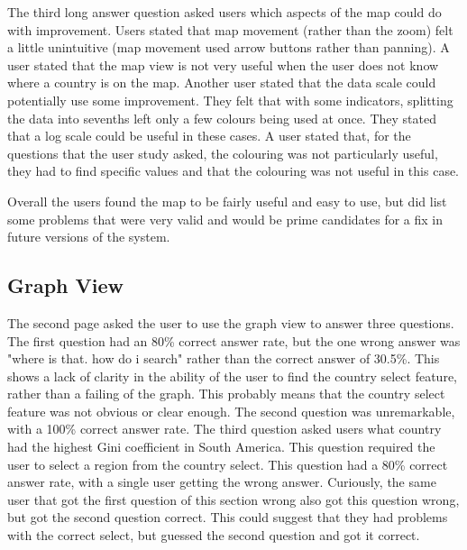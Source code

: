 \documentclass[10pt, journal]{IEEEtran}
\begin{document}
The third long answer question asked users which aspects of the map could do with improvement. Users stated that map movement (rather than the zoom) felt a little unintuitive (map movement used arrow buttons rather than panning). A user stated that the map view is not very useful when the user does not know where a country is on the map. Another user stated that the data scale could potentially use some improvement. They felt that with some indicators, splitting the data into sevenths left only a few colours being used at once. They stated that a log scale could be useful in these cases. A user stated that, for the questions that the user study asked, the colouring was not particularly useful, they had to find specific values and that the colouring was not useful in this case.

Overall the users found the map to be fairly useful and easy to use, but did list some problems that were very valid and would be prime candidates for a fix in future versions of the system.

\subsection{Graph View}

The second page asked the user to use the graph view to answer three questions. The first question had an 80\% correct answer rate, but the one wrong answer was "where is that. how do i search" rather than the correct answer of 30.5\%. This shows a lack of clarity in the ability of the user to find the country select feature, rather than a failing of the graph. This probably means that the country select feature was not obvious or clear enough. The second question was unremarkable, with a 100\% correct answer rate. The third question asked users what country had the highest Gini coefficient in South America. This question required the user to select a region from the country select. This question had a 80\% correct answer rate, with a single user getting the wrong answer. Curiously, the same user that got the first question of this section wrong also got this question wrong, but got the second question correct. This could suggest that they had problems with the correct select, but guessed the second question and got it correct. 
\end{document}
